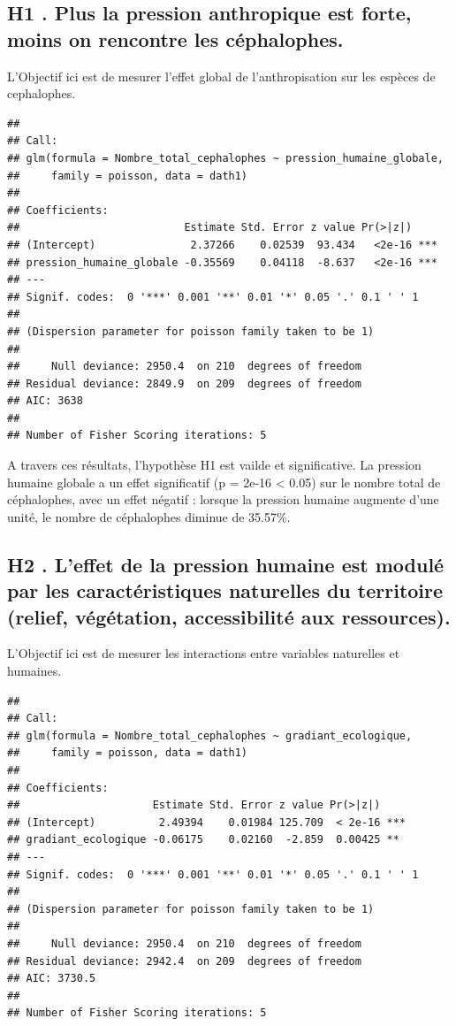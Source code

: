 \documentclass[
]{book}
\begin{document}
\subsection{H1 . Plus la pression anthropique est forte, moins on rencontre les céphalophes.}\label{h1-.-plus-la-pression-anthropique-est-forte-moins-on-rencontre-les-cuxe9phalophes.}

L'Objectif ici est de mesurer l'effet global de l'anthropisation sur les espèces de cephalophes.

\begin{verbatim}
## 
## Call:
## glm(formula = Nombre_total_cephalophes ~ pression_humaine_globale, 
##     family = poisson, data = dath1)
## 
## Coefficients:
##                          Estimate Std. Error z value Pr(>|z|)    
## (Intercept)               2.37266    0.02539  93.434   <2e-16 ***
## pression_humaine_globale -0.35569    0.04118  -8.637   <2e-16 ***
## ---
## Signif. codes:  0 '***' 0.001 '**' 0.01 '*' 0.05 '.' 0.1 ' ' 1
## 
## (Dispersion parameter for poisson family taken to be 1)
## 
##     Null deviance: 2950.4  on 210  degrees of freedom
## Residual deviance: 2849.9  on 209  degrees of freedom
## AIC: 3638
## 
## Number of Fisher Scoring iterations: 5
\end{verbatim}

A travers ces résultats, l'hypothèse H1 est vailde et significative. La pression humaine globale a un effet significatif (p = 2e-16 \textless{} 0.05) sur le nombre total de céphalophes, avec un effet négatif : lorsque la pression humaine augmente d'une unité, le nombre de céphalophes diminue de 35.57\%.

\subsection{H2 . L'effet de la pression humaine est modulé par les caractéristiques naturelles du territoire (relief, végétation, accessibilité aux ressources).}\label{h2-.-leffet-de-la-pression-humaine-est-moduluxe9-par-les-caractuxe9ristiques-naturelles-du-territoire-relief-vuxe9guxe9tation-accessibilituxe9-aux-ressources.}

L'Objectif ici est de mesurer les interactions entre variables naturelles et humaines.

\begin{verbatim}
## 
## Call:
## glm(formula = Nombre_total_cephalophes ~ gradiant_ecologique, 
##     family = poisson, data = dath1)
## 
## Coefficients:
##                     Estimate Std. Error z value Pr(>|z|)    
## (Intercept)          2.49394    0.01984 125.709  < 2e-16 ***
## gradiant_ecologique -0.06175    0.02160  -2.859  0.00425 ** 
## ---
## Signif. codes:  0 '***' 0.001 '**' 0.01 '*' 0.05 '.' 0.1 ' ' 1
## 
## (Dispersion parameter for poisson family taken to be 1)
## 
##     Null deviance: 2950.4  on 210  degrees of freedom
## Residual deviance: 2942.4  on 209  degrees of freedom
## AIC: 3730.5
## 
## Number of Fisher Scoring iterations: 5
\end{verbatim}
\end{document}
